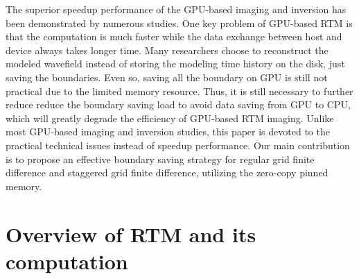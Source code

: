 The superior speedup performance of the GPU-based imaging and inversion has been demonstrated by numerous studies. One key problem of GPU-based RTM is that the computation is much faster while the data exchange between host and device always takes longer time.   Many researchers choose to reconstruct the modeled wavefield instead of storing the modeling time history on the disk, just saving the boundaries. Even so, saving all the boundary on GPU is still not practical due to the limited memory resource. Thus, it is still necessary to further reduce reduce the boundary saving load to avoid data saving from GPU to CPU, which will greatly degrade the efficiency of GPU-based RTM imaging. Unlike most GPU-based imaging and inversion studies, this paper is devoted to the practical technical issues instead of speedup performance. Our main contribution is to propose an effective boundary saving strategy for regular grid finite difference and staggered grid finite difference, utilizing the zero-copy pinned memory.


\section{Overview of RTM and its computation}

